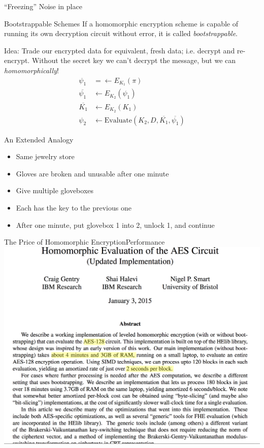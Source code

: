 \documentclass[12pt]{beamer}
\begin{document}
\begin{frame}{``Freezing'' Noise in place}
	\begin{block}{Bootstrappable Schemes}
		If a homomorphic encryption scheme is capable of running its own
		decryption circuit without error, it is called \textit{bootstrappable}.
	\end{block}

	Idea: Trade our encrypted data for equivalent, fresh data; i.e. decrypt and
	re-encrypt. Without the secret key we can't decrypt the message, but we can
	\textit{homomorphically}!
	\begin{align*}
		\psi_1 &= \leftarrow E_{K_1}(\pi) \\
		\overline{\psi_1} &\leftarrow E_{K_2}(\psi_1) \\
		\overline{K_1} &\leftarrow E_{K_2}(K_1) \\
		\psi_2 &\leftarrow \text{Evaluate}(K_2, D, \overline{K_1},
		\overline{\psi_1})
	\end{align*}
\end{frame}

\begin{frame}{An Extended Analogy}
	\begin{itemize}
		\item Same jewelry store
		\item Gloves are broken and unusable after one minute
		\item Give multiple gloveboxes
		\item Each has the key to the previous one
		\item After one minute, put glovebox 1 into 2, unlock 1, and continue
	\end{itemize}
\end{frame}

\begin{frame}{The Price of Homomorphic Encryption}{Performance}
	\includegraphics[width=\textwidth]{./pictures/homomorphic-aes}
\end{frame}
\end{document}
